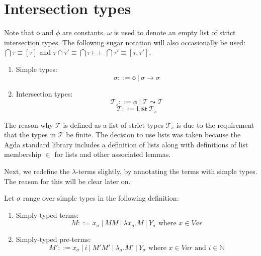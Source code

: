 \documentclass[a4paper, 12pt, twoside]{style/ociamthesis}
\theoremstyle{plain}
\theoremstyle{definition}
\newtheorem{Definition}{Definition}[chapter]
\theoremstyle{remark}
\providecommand{\tightlist}{%
  \setlength{\itemsep}{0pt}\setlength{\parskip}{0pt}}
\newcommand{\concat}{\ensuremath{+\!\!\!\!+\,}}
\renewenvironment{Definition}{\begin{OldDefinition}\begin{mdframed}[style=example, linecolor=cyan]}{\end{mdframed}\end{OldDefinition}}
\begin{document}
\newpage

\chapter{Intersection types}\label{intersection-types-1}

\label{chap:itypes}

\begin{Definition}[Intersection Types]

Note that \(\mathsf{o}\) and \(\phi\) are constants. \(\omega\) is used
to denote an empty list of strict intersection types. The following
sugar notation will also occasionally be used:
\(\bigcap \tau \equiv [ \tau ]\) and
\(\tau \cap \tau' \equiv \bigcap \tau \concat \bigcap \tau' \equiv [ \tau, \tau' ]\).

\begin{enumerate}
\def\labelenumi{\roman{enumi})}
\tightlist
\item
  Simple types: \[\sigma ::= \mathsf{o}\ |\ \sigma \to \sigma\]
\item
  Intersection types:
  \[\mathcal{T}_s ::= \phi\ |\ \mathcal{T} \leadsto \mathcal{T}\]
  \[\mathcal{T} ::= \mathsf{List}\ \mathcal{T}_s\]
\end{enumerate}

\end{Definition}

The reason why \(\mathcal{T}\) is defined as a list of strict types
\(\mathcal{T}_s\) is due to the requirement that the types in
\(\mathcal{T}\) be finite. The decision to use lists was taken because
the Agda standard library includes a definition of lists along with
definitions of list membership \(\in\) for lists and other associated
lemmas.

Next, we redefine the \(\lambda\)-terms slightly, by annotating the
terms with simple types. The reason for this will be clear later on.

\begin{Definition}[Terms]

Let \(\sigma\) range over simple types in the following definition:

\begin{enumerate}
\def\labelenumi{\roman{enumi})}
\tightlist
\item
  Simply-typed terms:
  \[M::= x_\sigma\ |\ MM\ |\ \lambda x_\sigma.M\ |\ Y_\sigma \text{ where }x \in Var\]
\item
  Simply-typed pre-terms:
  \[M'::= x_\sigma\ |\ i\ |\ M'M'\ |\ \lambda_\sigma.M'\ |\ Y_\sigma \text{ where }x \in Var\text{ and }i \in \mathbb{N}\]
\end{enumerate}

\end{Definition}
\end{document}
